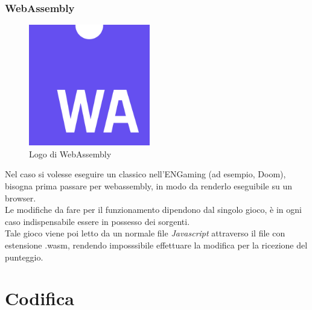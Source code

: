 \subsubsection{WebAssembly}
\begin{figure}[h]
    \centering
    \includegraphics[width=150pt]{images/technologies/webassembly.png}
    \caption{Logo di WebAssembly}
    \label{fig:webassembly}
\end{figure}
Nel caso si volesse eseguire un classico nell'ENGaming (ad esempio, Doom), bisogna prima passare per \gls{webassembly}, in modo da renderlo eseguibile su un browser.\\
Le modifiche da fare per il funzionamento dipendono dal singolo gioco, è in ogni caso indispensabile essere in possesso dei sorgenti.\\
Tale gioco viene poi letto da un normale file \emph{Javascript} attraverso il file con estensione .wasm, rendendo imposssibile effettuare la modifica per la ricezione del punteggio.


\section{Codifica}
